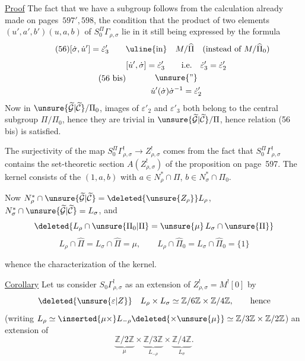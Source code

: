 
\uline{Proof} The fact that we have a subgroup follows from the calculation already made on pages\ $597',598$, the condition that the product of two elements $(u',a',b')(u,a,b)$ of $S_0^{\Pi}\Gamma_{\rho,\sigma}$ lie in it still being expressed by the formula
\[
\tag{56}
[\dot\sigma,\dot u']=\dot\varepsilon'_3
\qquad\text{\uline{in}}\quad M/\widehat\Pi
\quad(\text{instead of }M/\widehat\Pi_0)
\]
\[
\tag{56 bis}
\begin{gathered}
[\dot u',\dot\sigma]=\dot\varepsilon'_3
\qquad\text{i.e.}\quad \dot\varepsilon'_3=\dot\varepsilon'_2\\
\unsure{\text{''}}\\
\dot u'(\dot\sigma)\dot\sigma^{-1}=\dot\varepsilon'_2
\end{gathered}
\]
Now in $\unsure{\widetilde{\mathcal G}|\widetilde{\mathcal C}}/\Pi_0$,  images of $\varepsilon'_2$ and $\varepsilon'_3$ both belong to the central subgroup $\Pi/\Pi_0$, hence they are trivial in $\unsure{\widetilde{\mathcal G}|\widetilde{\mathcal C}}/\Pi$, hence relation (56 bis) is  satisfied.

The surjectivity of the map $S_0^\Pi\Gamma^!_{\rho,\sigma}\longrightarrow Z^!_{\rho,\sigma}$ comes from the fact that $S_0^\Pi\Gamma^!_{\rho,\sigma}$ contains the set-theoretic section $A(Z^!_{\rho,\sigma})$ of the proposition on page\ 597. The kernel consists of the  $(1,a,b)$ with $a\in N_\rho^*\cap\Pi$, $b\in N_\sigma^*\cap\Pi_0$.

Now $N_\rho^*\cap\unsure{\widetilde{\mathcal G}|\widetilde{\mathcal C}}=\deleted{\unsure{Z_\rho}}L_\rho$, $N_\sigma^*\cap\unsure{\widetilde{\mathcal G}|\widetilde{\mathcal C}}=L_\sigma$, and
\[
\deleted{L_\rho\cap\unsure{\Pi_0|\Pi}=\unsure{\mu}\,L_\sigma\cap\unsure{\Pi}}
\]
\[
\tag{57}
L_\rho\cap\widehat\Pi=L_\sigma\cap\widehat\Pi=\mu,
\qquad L_\rho\cap\widehat\Pi_0=L_\sigma\cap\widehat\Pi_0=\{1\}
\]


whence the characterization of the kernel.

\uline{Corollary} Let us consider  $S_0\Gamma^!_{\rho,\sigma}$ as an extension of $Z^!_{\rho,\sigma}=M^![0]$ by
\[
\deleted{\unsure{\varepsilon|Z}}\quad
L_\rho\times L_\sigma\simeq\mathbb Z/6\mathbb Z\times\mathbb Z/4\mathbb Z,
\qquad\text{hence}
\]
(writing $L_\rho\simeq\inserted{\mu\times}L_{-\rho}\deleted{\times\unsure{\mu}}\simeq\mathbb Z/3\mathbb Z\times\mathbb Z/2\mathbb Z$)
an extension of
\[
\underbrace{\mathbb Z/2\mathbb Z}_{\mu}\times
\underbrace{\mathbb Z/3\mathbb Z}_{L_{-\rho}}\times
\underbrace{\mathbb Z/4\mathbb Z}_{L_\sigma}.
\]

